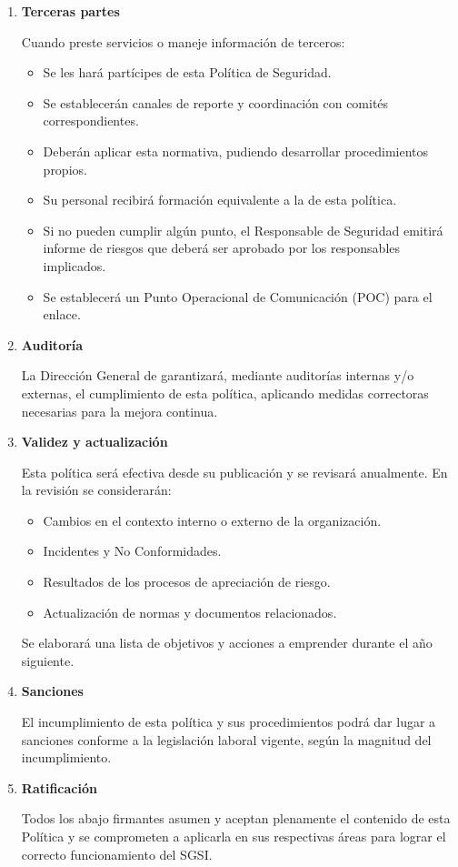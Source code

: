 \begin{enumerate}[label=\alph*)]
\item \textbf{Terceras partes}

Cuando \Beneficiario{} preste servicios o maneje informaci\'on de terceros:

\begin{itemize}
  \item Se les har\'a part\'icipes de esta Pol\'itica de Seguridad.
  \item Se establecer\'an canales de reporte y coordinaci\'on con comit\'es correspondientes.
  \item Deber\'an aplicar esta normativa, pudiendo desarrollar procedimientos propios.
  \item Su personal recibir\'a formaci\'on equivalente a la de esta pol\'itica.
  \item Si no pueden cumplir alg\'un punto, el Responsable de Seguridad emitir\'a informe de riesgos que deber\'a ser aprobado por los responsables implicados.
  \item Se establecer\'a un Punto Operacional de Comunicaci\'on (POC) para el enlace.
\end{itemize}

\item \textbf{Auditor\'ia}

La Direcci\'on General de \Beneficiario{} garantizar\'a, mediante auditor\'ias internas y/o externas, el cumplimiento de esta pol\'itica, aplicando medidas correctoras necesarias para la mejora continua.

\item \textbf{Validez y actualizaci\'on}

Esta pol\'itica ser\'a efectiva desde su publicaci\'on y se revisar\'a anualmente. En la revisi\'on se considerar\'an:

\begin{itemize}
  \item Cambios en el contexto interno o externo de la organizaci\'on.
  \item Incidentes y No Conformidades.
  \item Resultados de los procesos de apreciaci\'on de riesgo.
  \item Actualizaci\'on de normas y documentos relacionados.
\end{itemize}

Se elaborar\'a una lista de objetivos y acciones a emprender durante el a\~no siguiente.

\item \textbf{Sanciones}

El incumplimiento de esta pol\'itica y sus procedimientos podr\'a dar lugar a sanciones conforme a la legislaci\'on laboral vigente, seg\'un la magnitud del incumplimiento.

\item \textbf{Ratificaci\'on}

Todos los abajo firmantes asumen y aceptan plenamente el contenido de esta Pol\'itica y se comprometen a aplicarla en sus respectivas \'{a}reas para lograr el correcto funcionamiento del SGSI.

\end{enumerate}
